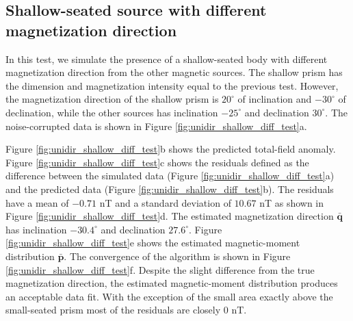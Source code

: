 \subsection{Shallow-seated source with different magnetization direction}

In this test, we simulate the presence of a shallow-seated body with different magnetization direction from the other magnetic sources. The shallow prism has the dimension and magnetization intensity equal to the previous test. However, the magnetization direction of the shallow prism is $20^\circ$ of inclination and $-30^\circ$ of declination, while the other sources has inclination $-25^\circ$ and declination $30^\circ$. The noise-corrupted data is shown in Figure \ref{fig:unidir_shallow_diff_test}a.

Figure \ref{fig:unidir_shallow_diff_test}b shows the predicted total-field anomaly. Figure \ref{fig:unidir_shallow_diff_test}c shows the residuals defined as the difference between the simulated data (Figure \ref{fig:unidir_shallow_diff_test}a) and the predicted data (Figure \ref{fig:unidir_shallow_diff_test}b). The residuals have a mean of $-0.71$ nT and a standard deviation of $10.67$ nT as shown in Figure \ref{fig:unidir_shallow_diff_test}d. The estimated magnetization direction $\bar{\mathbf{q}}$ has inclination $-30.4^\circ$ and declination $27.6^\circ$. Figure \ref{fig:unidir_shallow_diff_test}e shows the estimated magnetic-moment distribution $\bar{\mathbf{p}}$. The convergence of the algorithm is shown in Figure \ref{fig:unidir_shallow_diff_test}f. Despite the slight difference from the true magnetization direction, the estimated magnetic-moment distribution produces an acceptable data fit. With the exception of the small area exactly above the small-seated prism most of the residuals are closely $0$ nT.  

